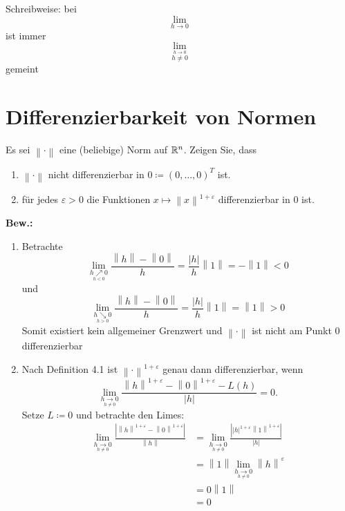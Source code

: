 \documentclass[sectionformat=aufgabe]{gadsescript}
\begin{document}
\maketitle
Schreibweise: bei
\[
	\lim_{h \to 0} 
\]
ist immer
\[
	\lim_{\overset{h\to 0}{h\neq 0}} 
\]
gemeint

\section{Differenzierbarkeit von Normen}
Es sei $ \left\| \cdot  \right\|  $ eine (beliebige) Norm auf $ \mathbb{R} ^n $. Zeigen Sie, dass
\begin{enumerate}[label=(\alph*)]
	\item $ \left\| \cdot  \right\|  $ nicht differenzierbar in $ 0 \coloneqq \left( 0, \dotsc, 0 \right) ^T $ ist.
	\item für jedes $ \varepsilon > 0 $ die Funktionen $ x \mapsto \left\| x \right\| ^{1 + \varepsilon }  $ differenzierbar in $ 0 $ ist.
\end{enumerate}

\textbf{Bew.:}\\
\begin{enumerate}[label=(\alph*)]
	\item Betrachte
		\[
			\lim_{\underset{h < 0}{h \nearrow 0}} \frac{ \left\| h \right\| - \left\| 0 \right\| }{ h } = \frac{\left| h \right| }{ h } \left\| 1 \right\| = - \left\| 1 \right\| < 0
		\]
		und
		\[
			\lim_{\underset{h > 0}{h \searrow 0}} \frac{ \left\| h \right\| - \left\| 0 \right\| }{ h } = \frac{\left| h \right| }{ h } \left\| 1 \right\| = \left\| 1 \right\| > 0
		\]
		Somit existiert kein allgemeiner Grenzwert und $ \left\| \cdot  \right\|  $ ist nicht am Punkt $ 0 $ differenzierbar
	\item Nach Definition 4.1 ist $ \left\| \cdot  \right\| ^{1 + \varepsilon }  $ genau dann differenzierbar, wenn
		\[
			\lim_{\underset{h \neq 0}{h \to 0}} \frac{ \left\| h \right\| ^{1 + \varepsilon } - \left\| 0 \right\| ^{1 + \varepsilon }  - L(h) }{ \left| h \right|  } = 0.
		\]
		Setze $ L \coloneqq 0 $ und betrachte den Limes:
		\begin{align*}
			\lim_{\underset{h \neq 0}{h \to 0}} \frac{ \left| \left\| h \right\| ^{1 + \varepsilon } - \left\| 0 \right\| ^{1 + \varepsilon } \right| }{ \left\| h \right\|  } &= \lim_{\underset{h \neq 0}{h \to 0}} \frac{ \left| \left| h \right| ^{1 + \varepsilon } \left\| 1 \right\| ^{1 + \varepsilon } \right| }{ \left| h \right|  }  \\
			~ &= \left\| 1 \right\|  \lim_{\underset{h \neq 0}{h \to 0}} \left\| h \right\| ^{\varepsilon } \\
			~ &= 0 \left\| 1 \right\| \\
			~ &= 0
		\end{align*}
\end{enumerate}
\end{document}
